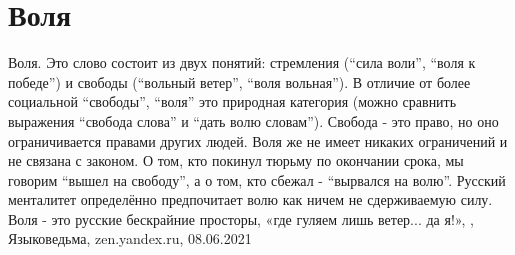  
 
 
 
 
\chapter{Воля}

Воля. Это слово состоит из двух понятий: стремления (\enquote{сила воли},
\enquote{воля к победе}) и свободы (\enquote{вольный ветер}, \enquote{воля
вольная}). В отличие от более социальной \enquote{свободы}, \enquote{воля} это
природная категория (можно сравнить выражения \enquote{свобода слова} и
\enquote{дать волю словам}). Свобода - это право, но оно ограничивается правами
других людей. Воля же не имеет никаких ограничений и не связана с законом. О
том, кто покинул тюрьму по окончании срока, мы говорим \enquote{вышел на
свободу}, а о том, кто сбежал - \enquote{вырвался на волю}. Русский менталитет
определённо предпочитает волю как ничем не сдерживаемую силу. Воля - это
русские бескрайние просторы, «где гуляем лишь ветер... да я!»,
, Языковедьма, zen.yandex.ru, 08.06.2021

